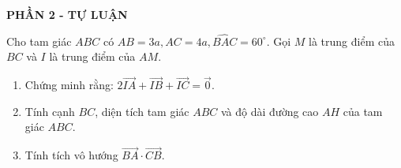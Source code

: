 \begin{center}
	\textbf{PHẦN 2 - TỰ LUẬN}
\end{center}



\begin{bt}%
	Cho tam giác $ABC$ có $AB=3a,AC=4a,\widehat{BAC}=60^{\circ}$. Gọi $M$ là trung điểm của $BC$ và $I$ là trung điểm của $AM$.
	\begin{enumerate}
		\item Chứng minh rằng: $2\overrightarrow{IA}+\overrightarrow{IB}+\overrightarrow{IC}=\overrightarrow{0}$.
		\item Tính cạnh $BC$, diện tích tam giác $ABC$ và độ dài đường cao $AH$ của tam giác $ABC$.
		\item Tính tích vô hướng $\overrightarrow{BA}\cdot\overrightarrow{CB}$.
	\end{enumerate}
\end{bt}
